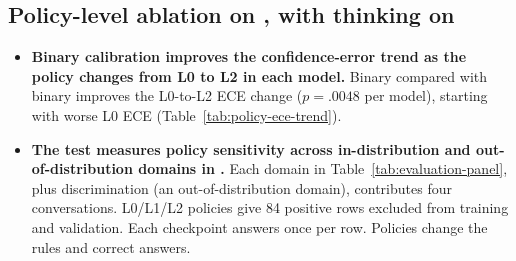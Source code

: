 \subsection*{Policy-level ablation on \SP{}, with thinking on}
\begin{itemize}
\item \textbf{Binary calibration improves the confidence-error trend as the policy changes from L0 to L2 in each model.} Binary \armB{} compared with binary \armA{} improves the L0-to-L2 ECE change ($p=.0048$ per model), starting with worse L0 ECE (Table~\ref{tab:policy-ece-trend}).
\item \textbf{The test measures policy sensitivity across in-distribution and out-of-distribution domains in \SP{}.} Each domain in Table~\ref{tab:evaluation-panel}, plus discrimination (an out-of-distribution domain), contributes four conversations. L0/L1/L2 policies give 84 positive rows excluded from training and validation. Each checkpoint answers once per row. Policies change the rules and correct answers.
\end{itemize}
\par
\par\smallskip
\endgroup
